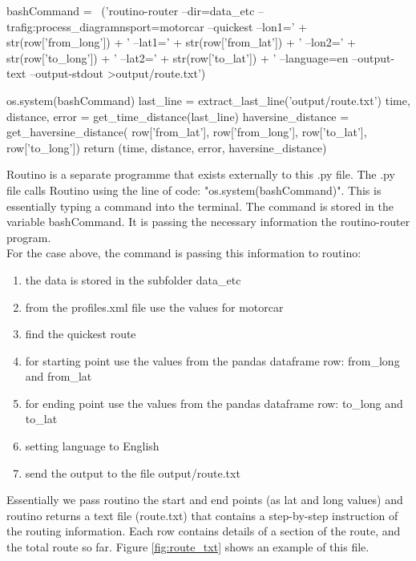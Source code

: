 \documentclass{article}
\begin{document}
\begin{flushleft}
\begin{python}
  bashCommand = \	
  ('routino-router --dir=data_etc --trafig:process_diagramnsport=motorcar 
  --quickest --lon1=' + str(row['from_long']) + ' --lat1=' 
  + str(row['from_lat']) + ' --lon2=' + str(row['to_long'])
  + ' --lat2=' + str(row['to_lat']) + ' --language=en 
  --output-text --output-stdout >output/route.txt')

  os.system(bashCommand)
  last_line = extract_last_line('output/route.txt')
  time, distance, error = get_time_distance(last_line)
  haversine_distance = get_haversine_distance(
   					row['from_lat'], row['from_long'], 
					row['to_lat'], row['to_long'])
	return (time, distance, error, haversine_distance)
\end{python}

Routino is a separate programme that exists externally to this .py file. The .py file calls Routino using the line of code: "os.system(bashCommand)". This is essentially typing a command into the terminal.
The command is stored in the variable bashCommand. It is passing the necessary information the routino-router program.\\
\vspace{\baselineskip}
For the case above, the command is passing this information to routino:
\begin{enumerate}
	\item the data is stored in the subfolder data\_etc
	\item from the profiles.xml file use the values for motorcar
    \item find the quickest route
    \item for starting point use the values from the pandas dataframe row: from\_long and from\_lat
    \item for ending point use the values from the pandas dataframe row: to\_long and to\_lat	
    \item setting language to English
	\item send the output to the file output/route.txt
\end{enumerate}

Essentially we pass routino the start and end points (as lat and long values) and routino returns a text file (route.txt) that contains a step-by-step instruction of the routing information. Each row contains details of a section of the route, and the total route so far. Figure \ref{fig:route_txt} shows an example of this file.\\

\newpage


\end{flushleft}
\end{document}
